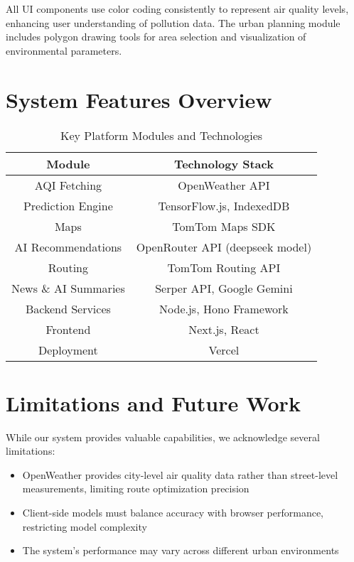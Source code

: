 \documentclass[conference]{IEEEtran}
\begin{document}
All UI components use color coding consistently to represent air quality levels, enhancing user understanding of pollution data. The urban planning module includes polygon drawing tools for area selection and visualization of environmental parameters.

\section{System Features Overview}
\begin{table}[htbp]
\caption{Key Platform Modules and Technologies}
\begin{center}
\begin{tabular}{|c|c|}
\hline
\textbf{Module} & \textbf{Technology Stack} \\
\hline
AQI Fetching & OpenWeather API \\
\hline
Prediction Engine & TensorFlow.js, IndexedDB \\
\hline
Maps & TomTom Maps SDK \\
\hline
AI Recommendations & OpenRouter API (deepseek model) \\
\hline
Routing & TomTom Routing API \\
\hline
News \& AI Summaries & Serper API, Google Gemini \\
\hline
Backend Services & Node.js, Hono Framework \\
\hline
Frontend & Next.js, React \\
\hline
Deployment & Vercel \\
\hline
\end{tabular}
\label{tab:modules}
\end{center}
\end{table}

\section{Limitations and Future Work}
While our system provides valuable capabilities, we acknowledge several limitations:
\begin{itemize}
    \item OpenWeather provides city-level air quality data rather than street-level measurements, limiting route optimization precision
    \item Client-side models must balance accuracy with browser performance, restricting model complexity
    \item The system's performance may vary across different urban environments
\end{itemize}
\end{document}
